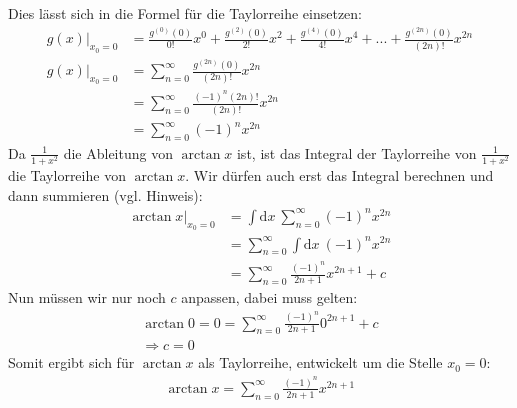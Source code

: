 \documentclass{theozettel}
\begin{document}
Dies lässt sich in die Formel für die Taylorreihe einsetzen:
\begin{align*}
g(x)\big|_{x_0=0}&=\frac{g^{\left(0\right)}\left(0\right)}{0!}x^0+\frac{g^{\left(2\right)}\left(0\right)}{2!}x^2+\frac{g^{\left(4\right)}\left(0\right)}{4!}x^4+...+\frac{g^{\left(2n\right)}\left(0\right)}{\left(2n\right)!}x^{2n}\\
g(x)\big|_{x_0=0}&=\sum_{n=0}^\infty\frac{g^{\left(2n\right)}\left(0\right)}{\left(2n\right)!}x^{2n}\\
&=\sum_{n=0}^\infty\frac{\left(-1\right)^n\left(2n\right)!}{\left(2n\right)!}x^{2n}\\
&=\sum_{n=0}^\infty\left(-1\right)^nx^{2n}
\end{align*}
Da $\frac{1}{1+x^2}$ die Ableitung von $\arctan x$ ist, ist das Integral der Taylorreihe von $\frac{1}{1+x^2}$ die Taylorreihe von $\arctan x$. Wir dürfen auch erst das Integral berechnen und dann summieren (vgl. Hinweis):
\begin{align*}
\arctan x\big|_{x_0=0}&=\int\text{d}x \ \sum_{n=0}^\infty\left(-1\right)^nx^{2n}\\
&=\sum_{n=0}^\infty\int\text{d}x \ \left(-1\right)^nx^{2n}\\
&=\sum_{n=0}^\infty\frac{\left(-1\right)^n}{2n+1}x^{2n+1}+c
\end{align*}
Nun müssen wir nur noch $c$ anpassen, dabei muss gelten:\\
\begin{align*}
\arctan 0= 0=\sum_{n=0}^\infty\frac{\left(-1\right)^n}{2n+1}0^{2n+1}+c\\
\Rightarrow c=0
\end{align*}
Somit ergibt sich für $\arctan x$ als Taylorreihe, entwickelt um die Stelle $x_0=0$:
\begin{align*}
\arctan x=\sum_{n=0}^\infty\frac{\left(-1\right)^n}{2n+1}x^{2n+1}
\end{align*}
\end{document}
